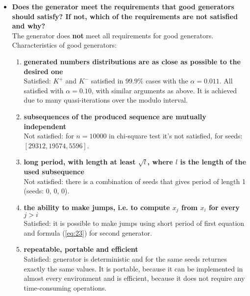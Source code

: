 \documentclass[a4paper,10pt]{article}
\begin{document}
\begin{itemize}
 \item \textbf{Does the generator meet the requirements that good generators should satisfy? If not, which of the requirements are not satisfied and why?} \\
  The generator does \textbf{not} meet all requirements for good generators. \\
  Characteristics of good generators:
   \begin{enumerate}
    \item \textbf{generated numbers distributions are as close as possible to the desired one} \\
    Satisfied: $K^+$ and $K^-$ satisfied in $99.9\%$ cases with the $\alpha = 0.011$. All satisfied with $\alpha = 0.10$, with similar arguments as above. It is achieved due to many quasi-iterations over the modulo interval.
    \item \textbf{subsequences of the produced sequence are mutually independent} \\
    Not satisfied: for $n=10000$ in chi-square test it's not satisfied, for seeds: $[29312, 19574, 5596]$.
    \item \textbf{long period, with length at least $\sqrt{l}$, where $l$ is the length of the used subsequence} \\
    Not satisfied: there is a combination of seeds that gives period of length 1 (seeds: 0, 0, 0).
    \item \textbf{the ability to make jumps, i.e. to compute $x_j$ from $x_i$ for every $j > i$} \\
    Satisfied: it is possible to make jumps using short period of first equation and formula (\ref{eq:23}) for second generator.
    \item \textbf{repeatable, portable and efficient} \\
    Satisfied: generator is deterministic and for the same seeds returnes exactly the same values. It is portable, because it can be implemented in almost every environment and is efficient, because it does not require any time-consuming operations.   \end{enumerate}
 

\end{itemize}
\end{document}
